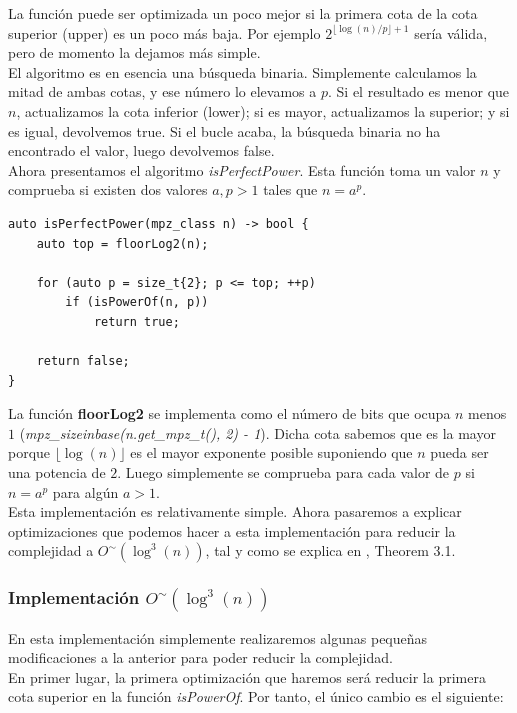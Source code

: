 La función puede ser optimizada un poco mejor si la primera cota de la cota superior (upper) es un poco más baja. Por ejemplo $2^{\lfloor \log(n)/p \rfloor + 1}$ sería válida, pero de momento la dejamos más simple.\\

El algoritmo es en esencia una búsqueda binaria. Simplemente calculamos la mitad de ambas cotas, y ese número lo elevamos a $p$. Si el resultado es menor que $n$, actualizamos la cota inferior (lower); si es mayor, actualizamos la superior; y si es igual, devolvemos true. Si el bucle acaba, la búsqueda binaria no ha encontrado el valor, luego devolvemos false.\\

Ahora presentamos el algoritmo \textit{isPerfectPower}. Esta función toma un valor $n$ y comprueba si existen dos valores $a, p > 1$ tales que $n = a^p$.\\

\begin{lstlisting}
auto isPerfectPower(mpz_class n) -> bool {
	auto top = floorLog2(n);

	for (auto p = size_t{2}; p <= top; ++p)
		if (isPowerOf(n, p))
			return true;

	return false;
}
\end{lstlisting}

La función \textbf{floorLog2} se implementa como el número de bits que ocupa $n$ menos $1$ (\textit{mpz\_sizeinbase(n.get\_mpz\_t(), 2) - 1}). Dicha cota sabemos que es la mayor porque $\lfloor\log(n)\rfloor$ es el mayor exponente posible suponiendo que $n$ pueda ser una potencia de $2$. Luego simplemente se comprueba para cada valor de $p$ si $n = a^p$ para algún $a > 1$.\\

Esta implementación es relativamente simple. Ahora pasaremos a explicar optimizaciones que podemos hacer a esta implementación para reducir la complejidad a $O^\sim(\log^3(n))$, tal y como se explica en \cite{bach_sorenson_1989}, Theorem 3.1.

\subsubsection{Implementación $O^\sim(\log^3(n))$}

En esta implementación simplemente realizaremos algunas pequeñas modificaciones a la anterior para poder reducir la complejidad.\\

En primer lugar, la primera optimización que haremos será reducir la primera cota superior en la función \textit{isPowerOf}. Por tanto, el único cambio es el siguiente:\\

